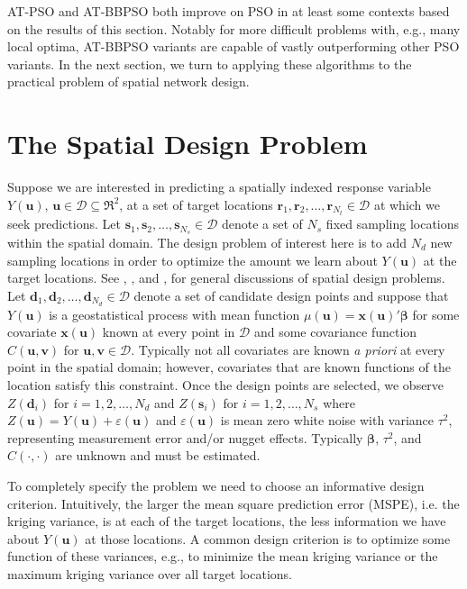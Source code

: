 \documentclass[cmbright]{staauth}
\begin{document}
AT-PSO and AT-BBPSO both improve on PSO in at least some contexts based on the results of this section. Notably for more difficult problems with, e.g., many local optima, AT-BBPSO variants are capable of vastly outperforming other PSO variants. In the next section, we turn to applying these algorithms to the practical problem of spatial network design.

\section{The Spatial Design Problem}\label{sec:spatialdesign}
Suppose we are interested in predicting a spatially indexed response variable $Y(\bm{u})$, $\bm{u}\in \mathcal{D}\subseteq \Re^2$, at a set of target locations $\bm{r}_1, \bm{r}_2, \dots, \bm{r}_{N_t}\in\mathcal{D}$ at which we seek predictions. Let $\bm{s}_1, \bm{s}_2, \dots, \bm{s}_{N_s}\in\mathcal{D}$ denote a set of $N_s$ fixed sampling locations within the spatial domain. The design problem of interest here is to add $N_d$ new sampling locations in order to optimize the amount we learn about $Y(\bm{u})$ at the target locations. See \cite{muller2007collecting}, \cite{mateu2012spatio}, and \citet[Section~11]{le2006statistical}, for general discussions of spatial design problems. Let $\bm{d}_1, \bm{d}_2, \dots, \bm{d}_{N_d}\in\mathcal{D}$ denote a set of candidate design points and suppose that $Y(\bm{u})$ is a geostatistical process with mean function $\mu(\bm{u})=\bm{x}(\bm{u})'\bm{\beta}$ for some covariate $\bm{x}(\bm{u})$ known at every point in $\mathcal{D}$ and some covariance function $C(\bm{u}, \bm{v})$ for $\bm{u},\bm{v}\in\mathcal{D}$. Typically not all covariates are known \emph{a priori} at every point in the spatial domain; however, covariates that are known functions of the location satisfy this constraint. Once the design points are selected, we observe $Z(\bm{d}_i)$ for $i=1,2,\dots,N_d$ and $Z(\bm{s}_i)$ for $i=1,2,\dots,N_s$ where $Z(\bm{u}) = Y(\bm{u}) + \varepsilon(\bm{u})$ and $\varepsilon(\bm{u})$ is mean zero white noise with variance $\tau^2$, representing measurement error and/or nugget effects. Typically $\bm{\beta}$, $\tau^2$, and $C(\cdot,\cdot)$ are unknown and must be estimated.

To completely specify the problem we need to choose an informative design criterion. Intuitively, the larger the mean square prediction error (MSPE), i.e. the kriging variance, is at each of the target locations, the less information we have about $Y(\bm{u})$ at those locations. A common design criterion is to optimize some function of these variances, e.g., to minimize the mean kriging variance or the maximum kriging variance over all target locations.
\end{document}
